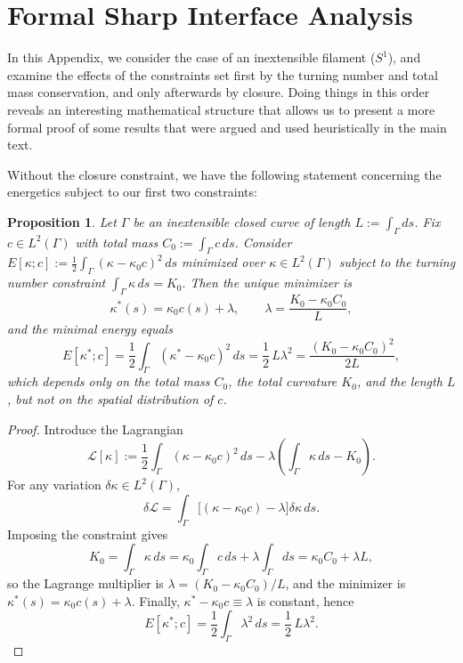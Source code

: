 \documentclass[
aip,
jcp,
reprint, 
floatfix
]{revtex4-1}
\newtheorem{proposition}[theorem]{Proposition}
\begin{document}
\section{Formal Sharp Interface Analysis}\label{secapp: sharp}

In this Appendix, we consider the case of an inextensible filament ($S^1$), and examine the effects of the constraints set first by the turning number and total mass conservation, and only afterwards by closure. Doing things in this order reveals an interesting mathematical structure that allows us to present a more formal proof of some results that were argued and used heuristically in the main text. 
 
Without the closure constraint, we have the following statement concerning the energetics subject to our first two constraints:

\begin{proposition}\label{prop: optimal_kappa}
Let $\Gamma$ be an inextensible closed curve of length $L:=\int_\Gamma ds$. Fix $c\in L^2(\Gamma)$ with total mass $C_0:=\int_\Gamma c\,ds$.
Consider
$
E[\kappa;c]:=\frac12\int_\Gamma (\kappa-\kappa_0 c)^2\,ds
$
minimized over $\kappa\in L^2(\Gamma)$ subject to the turning number constraint
$
\int_\Gamma \kappa\,ds = K_0.
$
Then the unique minimizer is
$$
\kappa^*(s)=\kappa_0 c(s)+\lambda,
\qquad
\lambda=\frac{K_0-\kappa_0 C_0}{L},
$$
and the minimal energy equals
$$
E[\kappa^*;c]
=\frac12\int_\Gamma (\kappa^*-\kappa_0 c)^2\,ds
=\frac12\,L\lambda^2
=\frac{(K_0-\kappa_0 C_0)^2}{2L},
$$
which depends only on the total mass $C_0$, the total curvature $K_0$, and the length $L$, but not on the spatial distribution of $c$.
\end{proposition}

\begin{proof}
Introduce the Lagrangian
\[
\mathcal{L}[\kappa]
:=\frac12\int_\Gamma(\kappa-\kappa_0 c)^2\,ds
-\lambda\left(\int_\Gamma\kappa\,ds-K_0\right).
\]
For any variation $\delta\kappa\in L^2(\Gamma)$,
\[
\delta\mathcal{L}
=\int_\Gamma \big[(\kappa-\kappa_0 c)-\lambda\big]\delta\kappa\,ds.
\]
Imposing the constraint gives
\[
K_0=\int_\Gamma \kappa\,ds
=\kappa_0\int_\Gamma c\,ds+\lambda\int_\Gamma ds
=\kappa_0 C_0+\lambda L,
\]
so the Lagrange multiplier is $\lambda=(K_0-\kappa_0 C_0)/L$, and the minimizer is $\kappa^*(s)=\kappa_0 c(s)+\lambda$.
Finally, $\kappa^*-\kappa_0 c\equiv \lambda$ is constant, hence
\[
E[\kappa^*;c]=\frac12\int_\Gamma \lambda^2\,ds=\frac12\,L\lambda^2.
\]
\end{proof}
\end{document}
